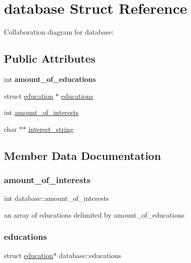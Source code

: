 \hypertarget{structdatabase}{}\section{database Struct Reference}
\label{structdatabase}


Collaboration diagram for database\+:
\subsection*{Public Attributes}
\begin{DoxyCompactItemize}
\item 
\mbox{\label{structdatabase_a1592f12e000127f6756bd50b43ec84ea}} 
int {\bfseries amount\+\_\+of\+\_\+educations}
\item 
struct \hyperlink{structeducation}{education} $\ast$ \hyperlink{structdatabase_a5a932fe1c10b5b2a7c6c364836c80ad6}{educations}
\item 
int \hyperlink{structdatabase_af76d884b82827d835d75a6065f7db54a}{amount\+\_\+of\+\_\+interests}
\item 
char $\ast$$\ast$ \hyperlink{structdatabase_aa677885704df7723ae0211e7f8977cc0}{interest\+\_\+string}
\end{DoxyCompactItemize}


\subsection{Member Data Documentation}
\mbox{\label{structdatabase_af76d884b82827d835d75a6065f7db54a}} 
\subsubsection{\texorpdfstring{amount\+\_\+of\+\_\+interests}{amount\_of\_interests}}
{\footnotesize\ttfamily int database\+::amount\+\_\+of\+\_\+interests}

an array of educations delimited by amount\+\_\+of\+\_\+educations \mbox{\label{structdatabase_a5a932fe1c10b5b2a7c6c364836c80ad6}} 
\subsubsection{\texorpdfstring{educations}{educations}}
{\footnotesize\ttfamily struct \hyperlink{structeducation}{education}$\ast$ database\+::educations}

